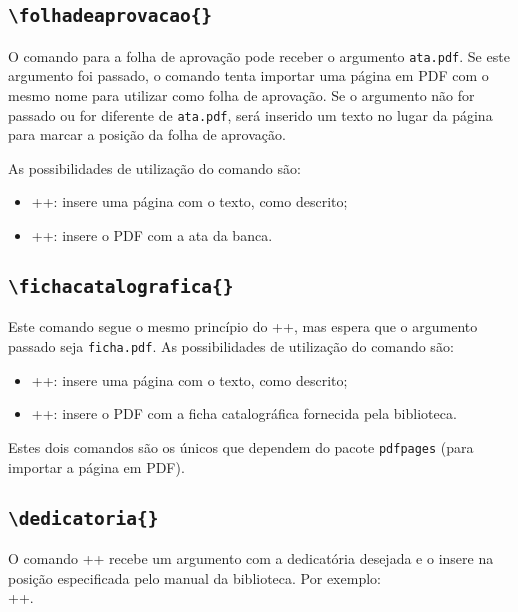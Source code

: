 \documentclass{fei}
\begin{document}
    \subsection{\texttt{\textbackslash folhadeaprovacao\{\}}}
    O comando para a folha de aprovação pode receber o argumento \texttt{ata.pdf}. Se este argumento foi passado, o comando tenta importar uma página em PDF com o mesmo nome para utilizar como folha de aprovação. Se o argumento não for passado ou for diferente de \texttt{ata.pdf}, será inserido um texto no lugar da página para marcar a posição da folha de aprovação.

    As possibilidades de utilização do comando são:
    \begin{itemize}
        \item \latexinline+\folhadeaprovacao{}+: insere uma página com o texto, como descrito;
        \item \latexinline++: insere o PDF com a ata da banca.
    \end{itemize}
    
    
    \subsection{\texttt{\textbackslash fichacatalografica\{\}}}
    Este comando segue o mesmo princípio do \latexinline+\folhadeaprovacao{}+, mas espera que o argumento passado seja \texttt{ficha.pdf}. As possibilidades de utilização do comando são:
    \begin{itemize}
        \item \latexinline+\fichacatalografica{}+: insere uma página com o texto, como descrito;
        \item \latexinline++: insere o PDF com a ficha catalográfica fornecida pela biblioteca.
    \end{itemize}
 
 Estes dois comandos são os únicos que dependem do pacote \texttt{pdfpages} (para importar a página em PDF).

    \subsection{\texttt{\textbackslash dedicatoria\{\}}}
    O comando \latexinline+\dedicatoria{}+ recebe um argumento com a dedicatória desejada e o insere na posição especificada pelo manual da biblioteca. Por exemplo: \\ \latexinline++.
    
\end{document}
